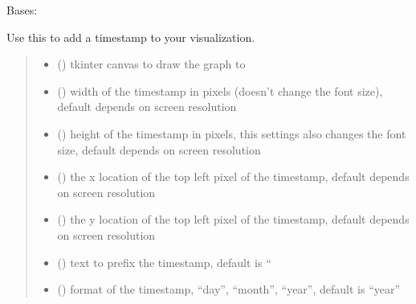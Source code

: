 \documentclass[letterpaper,10pt,english]{sphinxmanual}
\begin{document}
\begin{fulllineitems}
\pysigstopsignatures
\sphinxAtStartPar
Bases: {\hyperref[\detokenize{index:sjvisualizer.Canvas.sub_plot}]{}}

\sphinxAtStartPar
Use this to add a timestamp to your visualization.
\begin{quote}\begin{description}
\begin{itemize}
\item {} 
\sphinxAtStartPar
{} () \textendash{} tkinter canvas to draw the graph to

\item {} 
\sphinxAtStartPar
{} () \textendash{} width of the timestamp in pixels (doesn’t change the font size), default depends on screen resolution

\item {} 
\sphinxAtStartPar
{} () \textendash{} height of the timestamp in pixels, this settings also changes the font size, default depends on screen resolution

\item {} 
\sphinxAtStartPar
{} () \textendash{} the x location of the top left pixel of the timestamp, default depends on screen resolution

\item {} 
\sphinxAtStartPar
{} () \textendash{} the y location of the top left pixel of the timestamp, default depends on screen resolution

\item {} 
\sphinxAtStartPar
{} () \textendash{} text to prefix the timestamp, default is “

\item {} 
\sphinxAtStartPar
{} () \textendash{} format of the timestamp, “day”, “month”, “year”, default is “year”


\end{itemize}
\end{description}
\end{quote}
\end{fulllineitems}
\end{document}
